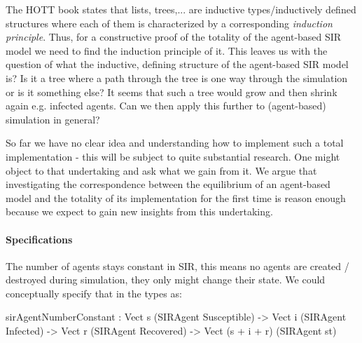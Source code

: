 The HOTT book \cite{program_homotopy_2013} states that lists, trees,... are inductive types/inductively defined structures where each of them is characterized by a corresponding \textit{induction principle}. Thus, for a constructive proof of the totality of the agent-based SIR model we need to find the induction principle of it. This leaves us with the question of what the inductive, defining structure of the agent-based SIR model is? Is it a tree where a path through the tree is one way through the simulation or is it something else? It seems that such a tree would grow and then shrink again e.g. infected agents. Can we then apply this further to (agent-based) simulation in general?


%
%

So far we have no clear idea and understanding how to implement such a total implementation - this will be subject to quite substantial research. One might object to that undertaking and ask what we gain from it. We argue that investigating the correspondence between the equilibrium of an agent-based model and the totality of its implementation for the first time is reason enough because we expect to gain new insights from this undertaking.

\paragraph{Specifications}
The number of agents stays constant in SIR, this means no agents are created / destroyed during simulation, they only might change their state. We could conceptually specify that in the types as:
\begin{HaskellCode}
sirAgentNumberConstant : Vect s (SIRAgent Susceptible) -> 
                         Vect i (SIRAgent Infected) ->
                         Vect r (SIRAgent Recovered) -> 
                         Vect (s + i + r) (SIRAgent st)
\end{HaskellCode}

